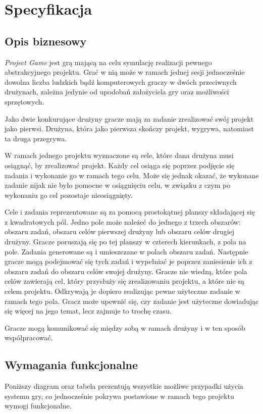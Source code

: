 \documentclass[11pt]{article}
\let\Oldsection\section
\renewcommand{\section}{\FloatBarrier\Oldsection}
\let\Oldsubsection\subsection
\renewcommand{\subsection}{\FloatBarrier\Oldsubsection}
\begin{document}
\newpage

\section{Specyfikacja}

\subsection{Opis biznesowy}
\par
\textit{Project Game} jest grą mającą na celu symulację realizacji pewnego abstrakcyjnego projektu. Grać w nią może w ramach jednej sesji jednocześnie dowolna liczba ludzkich bądź komputerowych graczy w dwóch przeciwnych drużynach, zależna jedynie od upodobań założyciela gry oraz możliwości sprzętowych.
\par
Jako dwie konkurujące drużyny gracze mają za zadanie zrealizować swój projekt jako pierwsi. Drużyna, która jako pierwsza skończy projekt, wygrywa, natomiast ta druga przegrywa.
\par
W ramach jednego projektu wyznaczone są cele, które dana drużyna musi osiągnąć, by zrealizować projekt. Każdy cel osiąga się poprzez podjęcie się zadania i wykonanie go w ramach tego celu. Może się jednak okazać, że wykonane zadanie nijak nie było pomocne w osiągnięciu celu, w związku z czym po wykonaniu go cel pozostaje nieosiągnięty.
\par
Cele i zadania reprezentowane są za pomocą prostokątnej planszy składającej się z kwadratowych pól. Jedno pole może należeć do jednego z trzech obszarów: obszaru zadań, obszaru celów pierwszej drużyny lub obszaru celów drugiej drużyny. Gracze poruszają się po tej planszy w czterech kierunkach, z pola na pole. Zadania generowane są i umieszczane w polach obszaru zadań. Następnie gracze mogą podejmować się tych zadań i wypełniać je poprzez zaniesienie ich z obszaru zadań do obszaru celów swojej drużyny. Gracze nie wiedzą, które pola celów zawierają cel, który przysłuży się zrealizowaniu projektu, a które nie są celem projektu. Odkrywają je dopiero realizując pewne użyteczne zadanie w ramach tego pola. Gracz może upewnić się, czy zadanie jest użyteczne dowiadując się więcej na jego temat, lecz zajmuje to trochę czasu.
\par
Gracze mogą komunikować się między sobą w ramach drużyny i w ten sposób współpracować.

\subsection{Wymagania funkcjonalne}
\par
Poniższy diagram oraz tabela prezentują wszystkie możliwe przypadki użycia systemu gry, co jednocześnie pokrywa postawione w ramach tego projektu wymogi funkcjonalne.
\end{document}

